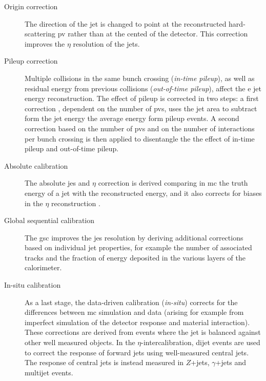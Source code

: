 \begin{description}
\item[Origin correction] The direction of the jet is changed to point at the reconstructed hard-scattering \gls{pv} rather than at the cented of the detector. This correction improves the $\eta$ resolution of the jets.

\item[Pileup correction] Multiple collisions in the same bunch crossing (\textit{in-time pileup}), as well as residual energy from previous collisions (\textit{out-of-time pileup}), affect the e jet energy reconstruction. The effect of pileup is corrected in two steps: a first correction \cite{Cacciari:2007fd,TheATLAScollaboration:2013pia}, dependent on the number of \glspl{pv}, uses the jet area to subtract form the jet energy the average energy form pileup events. A second correction based on the number of \glspl{pv} and on the number of interactions per bunch crossing is then applied to disentangle the the effect of in-time pileup and out-of-time pileup.

\item[Absolute calibration] The absolute \gls{jes} and $\eta$ correction is derived comparing in \gls{mc} the truth energy of a jet with the reconstructed energy, and it also corrects for biases in the $\eta$ reconstruction \cite{Aad2015jets}.

\item[Global sequential calibration] The \gls{gsc} \cite{ATLAS:2015oia} improves the \gls{jes} resolution by deriving additional corrections based on individual jet properties, for example the number of associated tracks and the fraction of energy deposited in the various layers of the calorimeter.

\item[In-situ calibration] As a last stage, the data-driven calibration (\textit{in-situ}) \cite{ATLAS:2015uwa} corrects for the differences between \gls{mc} simulation and data (arising for example from imperfect simulation of the detector response and material interaction). These corrections are derived from events where the jet \pt is balanced against other well measured objects. In the $\eta$-intercalibration, dijet events are used to correct the response of forward jets using well-measured central jets. The response of central jets is instead measured in $Z$+jets, $\gamma$+jets and multijet events. 
 
\end{description}

